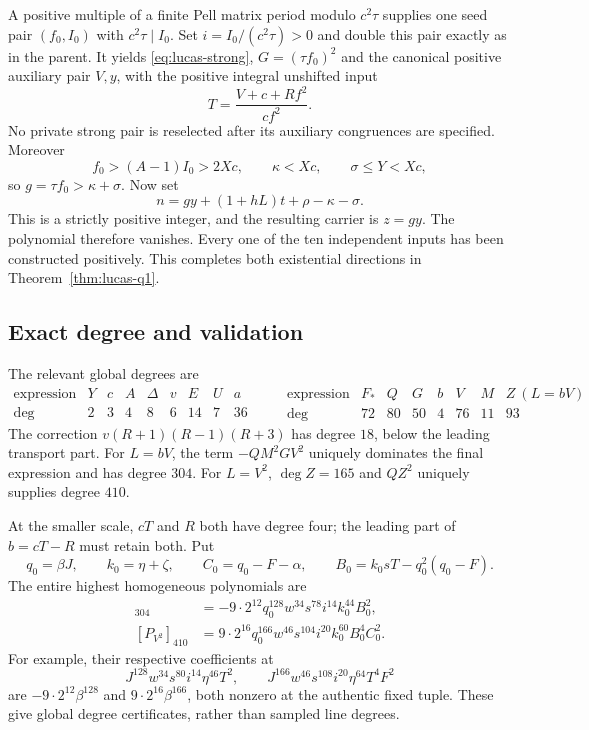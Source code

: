 \documentclass[11pt,letterpaper]{article}
\theoremstyle{definition}
\theoremstyle{remark}
\begin{document}
A positive multiple of a finite Pell matrix period modulo $c^2\tau$
supplies one seed pair $(f_0,I_0)$ with $c^2\tau\mid I_0$.
Set $i=I_0/(c^2\tau)>0$ and double this pair exactly as in the parent.
It yields \eqref{eq:lucas-strong}, $G=(\tau f_0)^2$ and the canonical
positive auxiliary pair $V,y$, with the positive integral unshifted input
\[
 T=\frac{V+c+Rf^2}{cf^2}.
\]
No private strong pair is reselected after its auxiliary congruences are
specified.  Moreover
\[
 f_0>(A-1)I_0>2Xc,\qquad \kappa<Xc,\qquad \sigma\le Y<Xc,
\]
so $g=\tau f_0>\kappa+\sigma$.  Now set
\[
 n=gy+(1+hL)t+\rho-\kappa-\sigma.
\]
This is a strictly positive integer, and the resulting carrier is $z=gy$.
The polynomial therefore vanishes.  Every one of the ten independent
inputs has been constructed positively.  This completes both existential
directions in Theorem~\ref{thm:lucas-q1}.

\subsection{Exact degree and validation}

The relevant global degrees are
\[
 \begin{array}{c|rrrrrrrr}
 \text{expression}&Y&c&A&\Delta&v&E&U&a\\\hline
 \deg&2&3&4&8&6&14&7&36
 \end{array}
 \qquad
 \begin{array}{c|rrrrrrr}
 \text{expression}&F_*&Q&G&b&V&M&Z\ (L=bV)\\\hline
 \deg&72&80&50&4&76&11&93
 \end{array}
\]
The correction $v(R+1)(R-1)(R+3)$ has degree $18$, below the leading
transport part.  For $L=bV$, the term $-QM^2GV^2$ uniquely dominates the
final expression and has degree $304$.  For $L=V^2$, $\deg Z=165$ and
$QZ^2$ uniquely supplies degree $410$.

At the smaller scale, $cT$ and $R$ both have degree four; the leading part
of $b=cT-R$ must retain both.  Put
\[
 q_0=\beta J,\qquad k_0=\eta+\zeta,\qquad C_0=q_0-F-\alpha,
 \qquad B_0=k_0sT-q_0^2(q_0-F).
\]
The entire highest homogeneous polynomials are
\begin{align*}
 [P_{bV}]_{304}
   &=-9\cdot2^{12}q_0^{128}w^{34}s^{78}i^{14}k_0^{44}B_0^2,\\
 [P_{V^2}]_{410}
   &=9\cdot2^{16}q_0^{166}w^{46}s^{104}i^{20}k_0^{60}B_0^4C_0^2.
\end{align*}
For example, their respective coefficients at
\[
 J^{128}w^{34}s^{80}i^{14}\eta^{46}T^2,\qquad
 J^{166}w^{46}s^{108}i^{20}\eta^{64}T^4F^2
\]
are $-9\cdot2^{12}\beta^{128}$ and
$9\cdot2^{16}\beta^{166}$, both nonzero at the authentic fixed tuple.
These give global degree certificates, rather than sampled line degrees.
\end{document}
